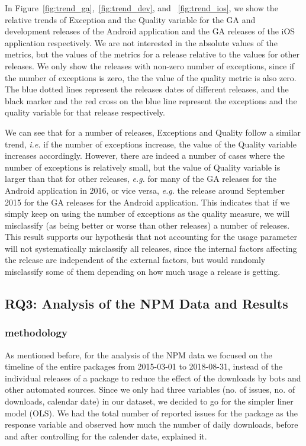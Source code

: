 \documentclass[smallcondensed]{svjour3}     %
\begin{document}
In Figure~\ref{fig:trend_ga},~\ref{fig:trend_dev}, and ~\ref{fig:trend_ios}, we show the relative trends of Exception and the Quality variable for the GA and development releases of the Android application and the GA releases of the iOS application respectively. We are not interested in the absolute values of the metrics, but the values of the metrics for a release relative to the values for other releases. We only show the releases with non-zero number of exceptions, since if the number of exceptions is zero, the the value of the quality metric is also zero. The blue dotted lines represent the releases dates of different releases, and the black marker and the red cross on the blue line represent the exceptions and the quality variable for that release respectively.

We can see that for a number of releases, Exceptions and Quality follow a similar trend, \emph{i.e.} if the number of exceptions increase, the value of the Quality variable increases accordingly. However, there are indeed a number of cases where the number of exceptions is relatively small, but the value of Quality variable is larger than that for other releases, \emph{e.g.} for many of the GA releases for the Android application in 2016, or vice versa, \emph{e.g.} the release around September 2015 for the  GA releases for the Android application. This indicates that if we simply keep on using the number of exceptions as the quality measure, we will misclassify (as being better or worse than other releases) a number of releases. This result supports our hypothesis that not accounting for the usage parameter will not systematically misclassify all releases, since the internal factors affecting the release are independent of the external factors, but would randomly misclassify some of them depending on how much usage a release is getting.

\vspace{-10pt}
\subsection{RQ3: Analysis of the NPM Data and Results}\label{s:npm}

\subsubsection{methodology}
\vspace{-10pt}
As mentioned before, for the analysis of the NPM data we focused on the timeline of the entire packages from 2015-03-01 to 2018-08-31, instead of the individual releases of a package to reduce the effect of the downloads by bots and other automated sources. Since we only had  three variables (no. of issues, no. of downloads, calendar date) in our dataset, we decided to go for the simpler liner model (OLS). We had the total number of reported issues for the package as the response variable and observed how much the number of daily downloads, before and after controlling for the calender date, explained it. 
 
\end{document}
